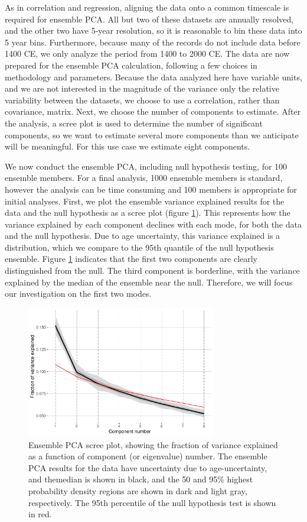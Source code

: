 \documentclass[gchron, manuscript]{copernicus}
\begin{document}
As in correlation and regression, aligning the data onto a common timescale is required for ensemble PCA.
All but two of these datasets are annually resolved, and the other two have 5-year resolution, so it is reasonable to bin these data into 5 year bins.
Furthermore, because many of the records do not include data before 1400 CE, we only analyze the period from 1400 to 2000 CE.
The data are now prepared for the ensemble PCA calculation, following a few choices in methodology and parameters.
Because the data analyzed here have variable units, and we are not interested in the magnitude of the variance only the relative variability between the datasets, we choose to use a correlation, rather than covariance, matrix.
Next, we choose the number of components to estimate.
After the analysis, a scree plot is used to determine the number of significant components, so we want to estimate several more components than we anticipate will be meaningful.
For this use case we estimate eight components.

We now conduct the ensemble PCA, including null hypothesis testing, for 100 ensemble members.
For a final analysis, 1000 ensemble members is standard, however the analysis can be time consuming and 100 members is appropriate for initial analyses.
First, we plot the ensemble variance explained results for the data and the null hypothesis as a scree plot (figure \ref{fig:scree}).
This represents how the variance explained by each component declines with each mode, for both the data and the null hypothesis. Due to age uncertainty, this variance explained is a distribution, which we compare to the 95th quantile of the null hypothesis ensemble.
Figure \ref{fig:scree} indicates that the first two components are clearly distinguished from the null.
The third component is borderline, with the variance explained by the median of the ensemble near the null.
Therefore, we will focus our investigation on the first two modes.

\begin{figure}
\includegraphics[width=8.3cm]{geoChronR-paper_files/figure-latex/scree-1} \caption{Ensemble PCA scree plot, showing the fraction of variance explained as a function of component (or eigenvalue) number. The ensemble PCA results for the data have uncertainty due to age-uncertainty, and themedian is shown in black, and the 50 and 95\% highest probability density regions are shown in dark and light gray, respectively. The 95th percentile of the null hypothesis test is shown in red.}\label{fig:scree}
\end{figure}
\end{document}
